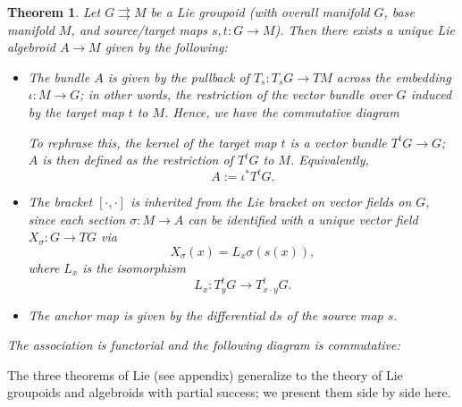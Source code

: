 \documentclass{tufte-handout}
\newtheorem{thrm}{Theorem}
\begin{document}
\begin{thrm} %
Let $G \rightrightarrows M$ be a Lie groupoid (with overall manifold $G$, base manifold $M$, and source/target maps $s,t: G \to M$). Then there exists a unique Lie algebroid $A \to M$ given by the following:
\begin{itemize}
\item The bundle $A$ is given by the pullback of $T_s : T_sG \to TM$ across the embedding $\iota: M \to G$; in other words, the restriction of the vector bundle over $G$ induced by the target map $t$ to $M$. Hence, we have the commutative diagram


To rephrase this, the kernel of the target map $t$ is a vector bundle $T^t G \to G$; $A$ is then defined as the restriction of $T^t G$ to $M$. Equivalently,
$$
A := \iota^* T^t G.
$$

\item The bracket $[\cdot,\cdot]$ is inherited from the Lie bracket on vector fields on $G$, since each section $\sigma: M \to A$ can be identified with a unique vector field $X_\sigma: G \to TG$ via
$$
X_\sigma (x) = L_x \sigma(s(x)),
$$
where $L_x$ is the isomorphism
$$
L_x : T^t_y G \to T^t_{x \cdot y} G.
$$

\item The anchor map is given by the differential $ds$ of the source map $s$.
\end{itemize}

The association is functorial and the following diagram is commutative:


\end{thrm}

The three theorems of Lie (see appendix) generalize to the theory of Lie groupoids and algebroids with partial success; we present them side by side here.
\end{document}
